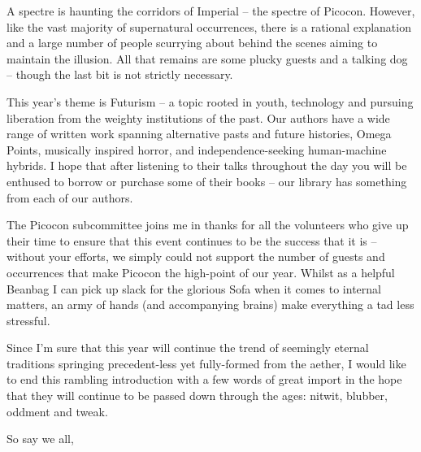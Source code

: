 A spectre is haunting the corridors of Imperial – the spectre of Picocon.  However, like the vast majority of supernatural occurrences, there is a rational explanation and a large number of people scurrying about behind the scenes aiming to maintain the illusion. All that remains are some plucky guests and a talking dog – though the last bit is not strictly necessary.

This year’s theme is Futurism – a topic rooted in youth, technology and pursuing liberation from the weighty institutions of the past\footnotemark[1]. Our authors have a wide range of written work spanning alternative pasts and future histories, Omega Points, musically inspired horror, and independence-seeking human-machine hybrids. I hope that after listening to their talks throughout the day you will be enthused to borrow or purchase some of their books – our library has something from each of our authors.

The Picocon subcommittee joins me in thanks for all the volunteers who give up their time to ensure that this event continues to be the success that it is – without your efforts, we simply could not support the number of guests and occurrences that make Picocon the high-point of our year. Whilst as a helpful Beanbag I can pick up slack for the glorious Sofa when it comes to internal matters, an army of hands (and accompanying brains) make everything a tad less stressful.

Since I’m sure that this year will continue the trend of seemingly eternal traditions springing precedent-less yet fully-formed from the aether, I would like to end this rambling introduction with a few words of great import in the hope that they will continue to be passed down through the ages: nitwit, blubber, oddment and tweak.

So say we all,

